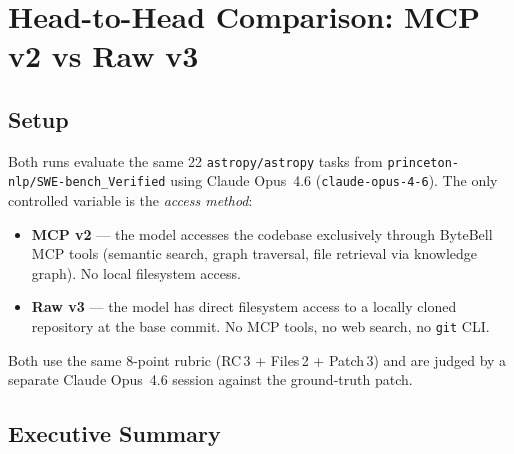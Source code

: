 
\section{Head-to-Head Comparison: MCP v2 vs Raw v3}\label{sec:comparison}

\subsection{Setup}

Both runs evaluate the same 22 \texttt{astropy/astropy} tasks from
\texttt{princeton-nlp/SWE-bench\_Verified} using
Claude Opus~4.6 (\texttt{claude-opus-4-6}).
The only controlled variable is the \emph{access method}:

\begin{itemize}
  \item \textbf{MCP v2} --- the model accesses the codebase exclusively
        through ByteBell MCP tools (semantic search, graph traversal,
        file retrieval via knowledge graph).  No local filesystem access.
  \item \textbf{Raw v3} --- the model has direct filesystem access to a
        locally cloned repository at the base commit.
        No MCP tools, no web search, no \texttt{git} CLI.
\end{itemize}

\noindent
Both use the same 8-point rubric
(RC\,3 + Files\,2 + Patch\,3) and are judged by a separate
Claude Opus~4.6 session against the ground-truth patch.

\subsection{Executive Summary}

